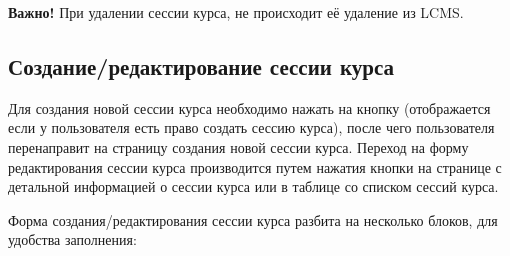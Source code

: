 \textbf{Важно!} При удалении сессии курса, не происходит её удаление из LCMS.

\subsection{Создание/редактирование сессии курса}
Для создания новой сессии курса необходимо нажать на кнопку  (отображается если у пользователя есть право создать сессию курса), после чего пользователя перенаправит на страницу создания новой сессии курса.
Переход на форму редактирования сессии курса производится путем нажатия кнопки  на странице с детальной информацией о сессии курса или в таблице со списком сессий курса.

Форма создания/редактирования сессии курса разбита на несколько блоков, для удобства заполнения:
